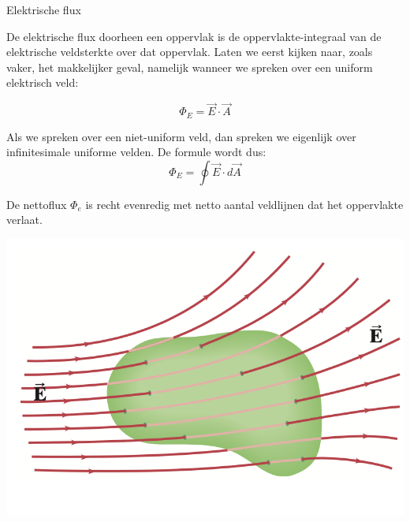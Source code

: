 \begin{theo}{Elektrische flux}

    
    De elektrische flux doorheen een oppervlak is de oppervlakte-integraal van de elektrische veldsterkte over dat oppervlak. Laten we eerst kijken naar, zoals vaker, het makkelijker geval, namelijk wanneer we spreken over een uniform elektrisch veld:
    
    \begin{equation*}
        \Phi_E = \Vec{E}\cdot\Vec{A}
    \end{equation*}
    
    \noindent Als we spreken over een niet-uniform veld, dan spreken we eigenlijk over infinitesimale uniforme velden. De formule wordt dus:
    \begin{equation*}
        \Phi_E = \oint \Vec{E}\cdot d\Vec{A}
    \end{equation*}
    
    \noindent De nettoflux $ \Phi_e $ is recht evenredig met netto aantal veldlijnen dat het oppervlakte verlaat.
    
        \begin{center}
            \includegraphics[scale = 0.35]{Images/Elektriciteit/OppervlakteGeenLading.png}
        \end{center}
\end{theo}

